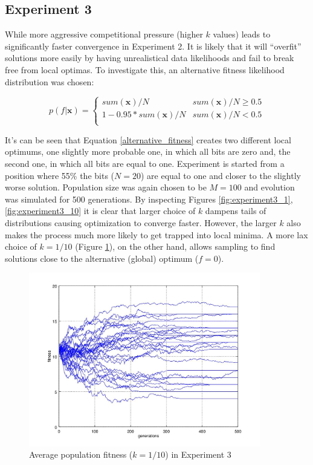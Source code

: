 \documentclass{article}
\begin{document}
\subsection{Experiment 3}

While more aggressive competitional pressure (higher $k$ values) leads to significantly faster convergence in Experiment 2. It is likely that it will ``overfit'' solutions more easily by having unrealistical data likelihoods and fail to break free from local optimas. To investigate this, an alternative fitness likelihood distribution was chosen:

\begin{equation}
  p(f|\mathbf{x}) = 
  \begin{cases}  
    sum(\mathbf{x})/N & sum(\mathbf{x})/N \geq 0.5 \\
    1 - 0.95*sum(\mathbf{x})/N & sum(\mathbf{x})/N < 0.5 \\
  \end{cases}
  \label{alternative_fitness}
\end{equation}

It's can be seen that Equation \ref{alternative_fitness} creates two different local optimums, one slightly more probable one, in which all bits are zero and, the second one, in which all bits are equal to one. Experiment is started from a position where 55\% the bits ($N=20$) are equal to one and closer to the slightly worse solution. Population size was again chosen to be $M=100$ and evolution was simulated for 500 generations.
By inspecting Figures \ref{fig:experiment3_1}, \ref{fig:experiment3_10} it is clear that larger choice of $k$ dampens tails of distributions causing optimization to converge faster. However, the larger $k$ also makes the process much more likely to get trapped into local minima. A more lax choice of $k=1/10$ (Figure \ref{fig:experiment3_01}), on the other hand, allows sampling to find solutions close to the alternative (global) optimum ($f = 0$).

\begin{figure}

\centering
\includegraphics[keepaspectratio,width=0.9\textwidth]{experiment3figure2_01.jpg}

\caption{Average population fitness ($k = 1/10$) in Experiment 3}

\label{fig:experiment3_01}

\end{figure}
\end{document}
